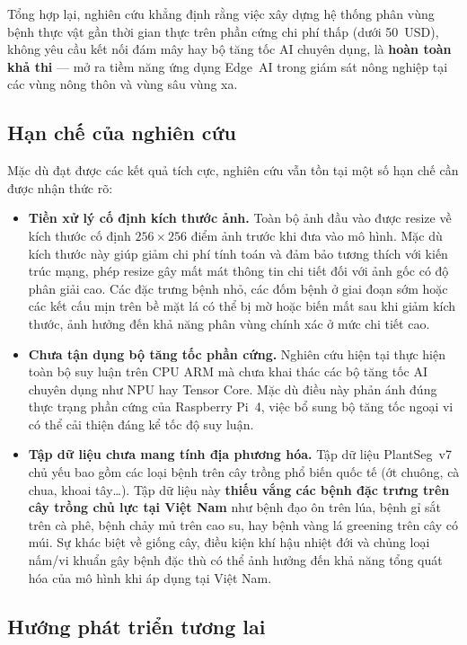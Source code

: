 \documentclass[conference]{IEEEtran}
\begin{document}
Tổng hợp lại, nghiên cứu khẳng định rằng việc xây dựng hệ thống phân vùng bệnh thực vật gần thời gian thực trên phần cứng chi phí thấp (dưới 50~USD), không yêu cầu kết nối đám mây hay bộ tăng tốc AI chuyên dụng, là \textbf{hoàn toàn khả thi} --- mở ra tiềm năng ứng dụng Edge~AI trong giám sát nông nghiệp tại các vùng nông thôn và vùng sâu vùng xa.

\subsection{Hạn chế của nghiên cứu}

Mặc dù đạt được các kết quả tích cực, nghiên cứu vẫn tồn tại một số hạn chế cần được nhận thức rõ:

\begin{itemize}
  \item \textbf{Tiền xử lý cố định kích thước ảnh.} Toàn bộ ảnh đầu vào được resize về kích thước cố định $256 \times 256$ điểm ảnh trước khi đưa vào mô hình. Mặc dù kích thước này giúp giảm chi phí tính toán và đảm bảo tương thích với kiến trúc mạng, phép resize gây mất mát thông tin chi tiết đối với ảnh gốc có độ phân giải cao. Các đặc trưng bệnh nhỏ, các đốm bệnh ở giai đoạn sớm hoặc các kết cấu mịn trên bề mặt lá có thể bị mờ hoặc biến mất sau khi giảm kích thước, ảnh hưởng đến khả năng phân vùng chính xác ở mức chi tiết cao.
  \item \textbf{Chưa tận dụng bộ tăng tốc phần cứng.} Nghiên cứu hiện tại thực hiện toàn bộ suy luận trên CPU ARM mà chưa khai thác các bộ tăng tốc AI chuyên dụng như NPU hay Tensor Core. Mặc dù điều này phản ánh đúng thực trạng phần cứng của Raspberry Pi~4, việc bổ sung bộ tăng tốc ngoại vi có thể cải thiện đáng kể tốc độ suy luận.
  \item \textbf{Tập dữ liệu chưa mang tính địa phương hóa.} Tập dữ liệu PlantSeg~v7 chủ yếu bao gồm các loại bệnh trên cây trồng phổ biến quốc tế (ớt chuông, cà chua, khoai tây\ldots). Tập dữ liệu này \textbf{thiếu vắng các bệnh đặc trưng trên cây trồng chủ lực tại Việt Nam} như bệnh đạo ôn trên lúa, bệnh gỉ sắt trên cà phê, bệnh chảy mủ trên cao su, hay bệnh vàng lá greening trên cây có múi. Sự khác biệt về giống cây, điều kiện khí hậu nhiệt đới và chủng loại nấm/vi khuẩn gây bệnh đặc thù có thể ảnh hưởng đến khả năng tổng quát hóa của mô hình khi áp dụng tại Việt Nam.
\end{itemize}

\subsection{Hướng phát triển tương lai}
\end{document}
